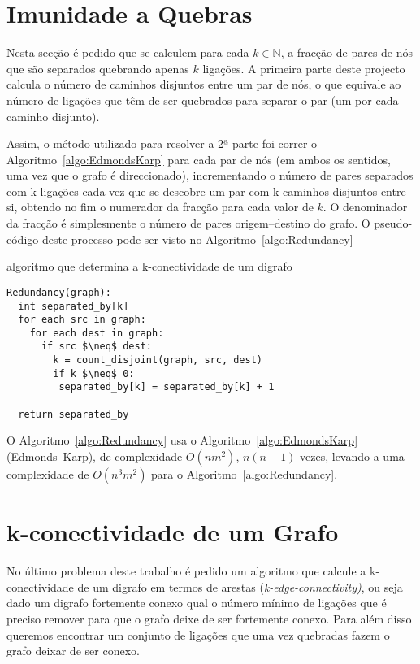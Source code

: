 \documentclass[10pt,a4paper]{article}
\begin{document}
\section{Imunidade a Quebras}
Nesta secção é pedido que se calculem para cada $k \in \mathbb{N} $, a fracção de pares de nós que são separados quebrando apenas $k$ ligações. A primeira parte deste projecto calcula o número de caminhos disjuntos entre um par de nós, o que equivale ao número de ligações que têm de ser quebrados para separar o par (um por cada caminho disjunto). 

Assim, o método utilizado para resolver a 2ª parte foi correr o Algoritmo~\ref{algo:EdmondsKarp} para cada par de nós (em ambos os sentidos, uma vez que o grafo é direccionado), incrementando o número de pares separados com k ligações cada vez que se descobre um par com k caminhos disjuntos entre si, obtendo no fim o numerador da fracção para cada valor de $k$. O denominador da fracção é simplesmente o número de pares origem--destino do grafo. O pseudo-código deste processo pode ser visto no Algoritmo~\ref{algo:Redundancy} 

\begin{algorithm}[h]
\caption{algoritmo que determina a k-conectividade de um digrafo}
\label{algo:Redundancy}
\begin{lstlisting}[linewidth=0.95\linewidth, mathescape]
Redundancy(graph):
  int separated_by[k]
  for each src in graph:
    for each dest in graph:
      if src $\neq$ dest:
        k = count_disjoint(graph, src, dest)
        if k $\neq$ 0:
         separated_by[k] = separated_by[k] + 1 

  return separated_by
\end{lstlisting}
\end{algorithm}

O Algoritmo~\ref{algo:Redundancy} usa o Algoritmo~\ref{algo:EdmondsKarp} (Edmonds--Karp), de complexidade $O(n m^2)$, $n(n-1)$ vezes, levando a uma complexidade de $O(n^3 m^2)$ para o Algoritmo~\ref{algo:Redundancy}.

\section{k-conectividade de um Grafo}
No último problema deste trabalho é pedido um algoritmo que calcule a k-conectividade de um digrafo em termos de arestas (\textit{k-edge-connectivity)}, ou seja dado um digrafo fortemente conexo qual o número mínimo de ligações que é preciso remover para que o grafo deixe de ser fortemente conexo. Para além disso queremos encontrar um conjunto de ligações que uma vez quebradas fazem o grafo deixar de ser conexo.
\end{document}
